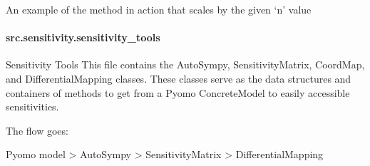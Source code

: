 \documentclass[letterpaper,10pt,english]{sphinxmanual}
\begin{document}

\begin{fulllineitems}
\label{\detokenize{src.sensitivity.faster_sensitivity:src.sensitivity.faster_sensitivity.toy_model}}
\pysigstartsignatures
\pysiglinewithargsret
{}
{}
{}
\pysigstopsignatures
\sphinxAtStartPar
An example of the method in action that scales by the given ‘n’ value

\begin{fulllineitems}
\label{\detokenize{src.sensitivity.faster_sensitivity:src.sensitivity.faster_sensitivity.toy_model.create_model}}
\pysigstartsignatures
\pysiglinewithargsret
{}
{}
{}
\pysigstopsignatures
\end{fulllineitems}


\end{fulllineitems}


\sphinxstepscope


\paragraph{src.sensitivity.sensitivity\_tools}
\label{\detokenize{src.sensitivity.sensitivity_tools:module-src.sensitivity.sensitivity_tools}}\label{\detokenize{src.sensitivity.sensitivity_tools:src-sensitivity-sensitivity-tools}}\label{\detokenize{src.sensitivity.sensitivity_tools::doc}}
\sphinxAtStartPar
Sensitivity Tools
This file contains the AutoSympy, SensitivityMatrix, CoordMap, and DifferentialMapping classes. These
classes serve as the data structures and containers of methods to get from a Pyomo ConcreteModel to easily
accessible sensitivities.

\sphinxAtStartPar
The flow goes:

\sphinxAtStartPar
Pyomo model \sphinxhyphen{}\textgreater{} AutoSympy \sphinxhyphen{}\textgreater{} SensitivityMatrix \sphinxhyphen{}\textgreater{} DifferentialMapping
\end{document}
